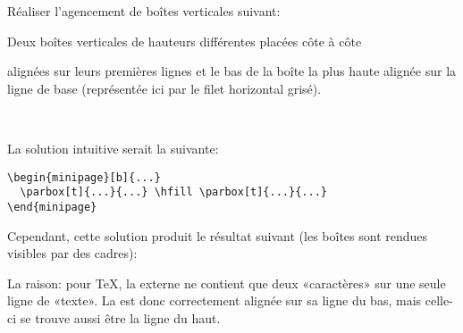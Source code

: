 \begin{exercice}
  \label{ex:boites:alignement-v}
  Réaliser l'agencement de boîtes verticales suivant:
  \begin{center}
    \begin{minipage}{0.8\linewidth}
      \makebox[0pt][l]{\color{lightgray}\rule{\linewidth}{0.7pt}}\relax
      \hfill
        \begin{minipage}[b]{0.95\linewidth}
          \small
          \parbox[t]{0.45\linewidth}{Deux boîtes verticales de
            hauteurs différentes placées côte à côte}
          \hfill
          \parbox[t]{0.45\linewidth}{alignées sur
            leurs premières lignes et le bas de la boîte
            la plus haute alignée sur la ligne de base (représentée
            ici par le filet horizontal grisé).} \\
          \mbox{}
        \end{minipage}
      \hfill
    \end{minipage}
  \end{center}

  La solution intuitive serait la suivante:
\begin{lstlisting}
\begin{minipage}[b]{...}
  \parbox[t]{...}{...} \hfill \parbox[t]{...}{...}
\end{minipage}
\end{lstlisting}
  Cependant, cette solution produit le résultat suivant (les boîtes
  sont rendues visibles par des cadres):
  \begin{center}
    \begin{minipage}{0.8\linewidth}
      \makebox[0pt][l]{\color{lightgray}\rule{\linewidth}{0.7pt}}\relax
      \hfill
      \hfill
    \end{minipage}
  \end{center}
  La raison: pour {\TeX}, la  externe ne contient que
  deux «caractères» sur une seule ligne de «texte». La 
  est donc correctement alignée sur sa ligne du bas, mais celle-ci se
  trouve aussi être la ligne du haut.


\end{exercice}
